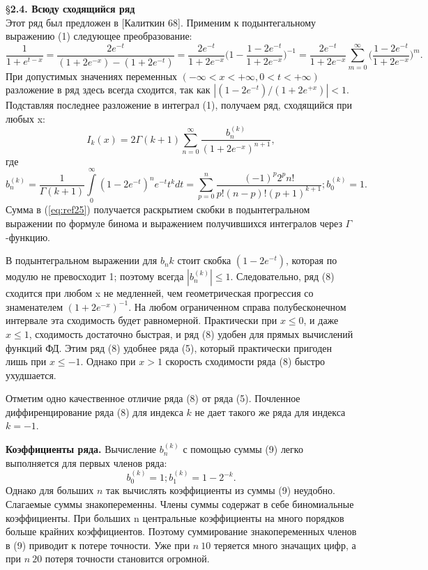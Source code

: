 \S \textbf{2.4. Всюду сходящийся ряд}
\\

Этот ряд был предложен в [Калиткин 68]. Применим к подынтегальному выражению
(1) следующее преобразование:
\begin{equation}
\frac{1}{1+e^{t-x}}=\frac{2e^{-t}}{(1+2e^{-x})-(1+2e^{-t})}=\frac{2e^{-t}}{1+2e^{-x}}\Bigg(1-\frac{1-2e^{-t}}{1+2e^{-x}}\Bigg)^{-1}=\frac{2e^{-t}}{1+2e^{-x}} \sum_{m=0}^{\infty} \Bigg(\frac{1-2e^{-t}}{1+2e^{-x}}\Bigg)^{m}.
\end{equation}
При допустимых значениях переменных $(-\infty < x < +\infty,0 < t < +\infty)$ разложение в
ряд здесь всегда сходится, так как $|(1-2e^{-t})/(1+2e^{+x})| < 1$. Подставляя
последнее разложение в интеграл (1), получаем ряд, сходящийся при любых x:
\begin{equation}
I_k(x)=2\Gamma(k+1)\sum_{n=0}^{\infty} \frac{b_n^{(k)}}{(1+2e^{-x})^{n+1}},
\label{eq:ref24}
\end{equation}
где
\begin{equation}
b_n^{(k)}=\frac{1}{\Gamma(k+1)}\int\limits_0^{\infty} (1-2e^{-t})^ne^{-t}t^kdt=\sum\limits_{p=0}^n \frac{(-1)^p 2^p n!}{p!(n-p)!(p+1)^{k+1}};b_0^{(k)}=1.
\label{eq:ref25}
\end{equation}
Сумма в (\ref{eq:ref25}) получается раскрытием скобки в подынтегральном выражении по
формуле бинома и выражением получившихся интегралов через $\Gamma$ -функцию.

В подынтегральном выражении для $b_nk$ стоит скобка $(1-2e^{-t})$, которая по
модулю не превосходит 1; поэтому всегда $|b_n^{(k)}| \leqslant 1$.
Следовательно, ряд (8) сходится при любом x не медленней, чем геометрическая прогрессия со
знаменателем $(1+2e^{-x})^{-1}$. На любом ограниченном справа полубесконечном
интервале эта сходимость будет равномерной. Практически при $x \leqslant 0$, и даже
$x \leqslant 1$, сходимость достаточно быстрая, и ряд (8) удобен для прямых вычислений
функций ФД. Этим ряд (8) удобнее ряда (5), который практически пригоден
лишь при $x \leqslant -1$. Однако при $x > 1$ скорость сходимости ряда (8) быстро
ухудшается.

Отметим одно качественное отличие ряда (8) от ряда (5). Почленное
диффиренцирование ряда (8) для индекса $k$ не дает такого же ряда для индекса
$k=-1$.

\textbf{Коэффициенты ряда.} Вычисление $b_n^{(k)}$ с помощью суммы (9) легко
выполняется для первых членов ряда:
\begin{equation}
b_0^{(k)}=1;b_1^{(k)}=1-2^{-k}.
\end{equation}
Однако для больших $n$ так вычислять коэффициенты из суммы (9) неудобно.
Слагаемые суммы знакопеременны. Члены суммы содержат в себе
биномиальные коэффициенты. При больших n центральные коэффициенты на
много порядков больше крайних коэффициентов. Поэтому суммирование
знакопеременных членов в (9) приводит к потере точности. Уже при $n~10$
теряется много значащих цифр, а при $n~20$ потеря точности становится
огромной.


